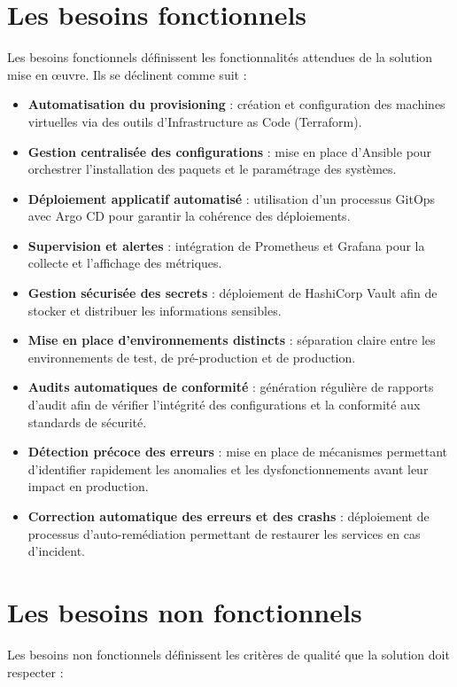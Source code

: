 \section{Les besoins fonctionnels}

Les besoins fonctionnels définissent les fonctionnalités attendues de la solution mise en œuvre. Ils se déclinent comme suit :

\begin{itemize}
    \item \textbf{Automatisation du provisioning} : création et configuration des machines virtuelles via des outils d'Infrastructure as Code (Terraform).
    \item \textbf{Gestion centralisée des configurations} : mise en place d'Ansible pour orchestrer l'installation des paquets et le paramétrage des systèmes.
    \item \textbf{Déploiement applicatif automatisé} : utilisation d'un processus GitOps avec Argo CD pour garantir la cohérence des déploiements.
    \item \textbf{Supervision et alertes} : intégration de Prometheus et Grafana pour la collecte et l'affichage des métriques.
    \item \textbf{Gestion sécurisée des secrets} : déploiement de HashiCorp Vault afin de stocker et distribuer les informations sensibles.
    \item \textbf{Mise en place d'environnements distincts} : séparation claire entre les environnements de test, de pré-production et de production.
    \item \textbf{Audits automatiques de conformité} : génération régulière de rapports d'audit afin de vérifier l'intégrité des configurations et la conformité aux standards de sécurité.
    \item \textbf{Détection précoce des erreurs} : mise en place de mécanismes permettant d'identifier rapidement les anomalies et les dysfonctionnements avant leur impact en production.
    \item \textbf{Correction automatique des erreurs et des crashs} : déploiement de processus d'auto-remédiation permettant de restaurer les services en cas d'incident.
\end{itemize}


\section{Les besoins non fonctionnels}

Les besoins non fonctionnels définissent les critères de qualité que la solution doit respecter :

